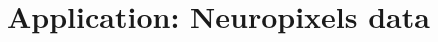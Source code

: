 \documentclass{article}
\begin{document}
%	
%	
	
	\section{Application: Neuropixels data}
	\label{app}
	
\end{document}
